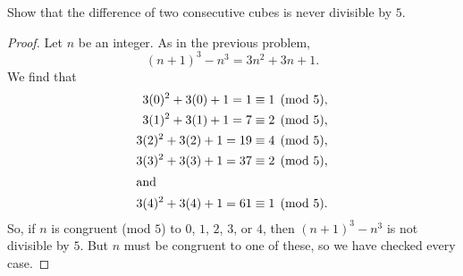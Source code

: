  Show that the difference of two consecutive cubes is
never divisible by $5$.
\begin{proof}
  Let $n$ be an integer. As in the previous problem,
  \begin{equation*}
    (n+1)^3 - n^3 = 3n^2 + 3n + 1.
  \end{equation*}
  We find that
  \begin{align*}
    3(0)^2 + 3(0) + 1 = 1 &\equiv1\pmod5, \\
    3(1)^2 + 3(1) + 1 = 7 &\equiv2\pmod5, \\
    3(2)^2 + 3(2) + 1 = 19 &\equiv4\pmod5, \\
    3(3)^2 + 3(3) + 1 = 37 &\equiv2\pmod5, \\
    \intertext{and}
    3(4)^2 + 3(4) + 1 = 61 &\equiv1\pmod5.
  \end{align*}
  So, if $n$ is congruent (mod $5$) to $0$, $1$, $2$, $3$, or $4$,
  then $(n+1)^3-n^3$ is not divisible by $5$. But $n$ must be
  congruent to one of these, so we have checked every case.
\end{proof}
